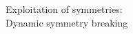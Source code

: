 \documentclass{beamer}
\begin{document}
\begin{frame}
\centering
\textcolor{UPMCEngagementBlueB}{\Large Exploitation of symmetries:}\\
\vspace{2em}
\textcolor{UPMCEngagementBlueB}{\Large Dynamic symmetry breaking}
\end{frame}




%
%
%
%
\end{document}
